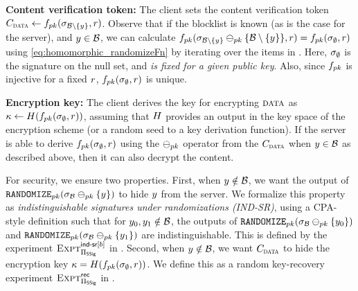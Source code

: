 \itemListStart
\item \textbf{Content verification token:} The client sets the content verification token $\contentToken{\clientData} \assign  \randomizeFn[\pubKey](\genericSig[\genericSetDiff[\blocklist][\genericCInputElmt]], \genericRand)$. Observe that if the blocklist \blocklist is known (as is the case for the server), and  $\genericCInputElmt \in \blocklist$, 
we can calculate
$\randomizeFn[\pubKey](\genericSig[\genericSetDiff[\blocklist][\genericCInputElmt]] 
\sigMinus[\pubKey] \{\genericSetDiff[\blocklist][\genericCInputElmt]\}, \genericRand) = 
\randomizeFn[\pubKey](\genericSig[\emptyset], \genericRand)$ using 
\eqref{eq:homomorphic_randomizeFn} by iterating over the items in \blocklist. Here, $\genericSig[\emptyset]$ 
is the signature on the null set, and \emph{is fixed for a given public key}. Also, since $\randomizeFn[\pubKey]$ is injective for a fixed $\genericRand$, $\randomizeFn[\pubKey](\genericSig[\emptyset], \genericRand)$ is unique. 

\item \textbf{Encryption key:} The client derives the key for encrypting $\clientData$ as
$\genericSymmKey \assign \ro(\randomizeFn[\pubKey](\genericSig[\emptyset], \genericRand))$, assuming that $H$ provides an output in the key space of the encryption scheme (or a random seed to a key derivation function). If the server is able to derive $\randomizeFn[\pubKey](\genericSig[\emptyset], \genericRand)$ using the $\sigMinus[\pubKey]$ operator from the $\contentToken{\clientData}$ when $\genericCInputElmt \in \blocklist$ as described above, then it can also decrypt the content.

\itemListEnd


For security, we ensure two properties. First, when 
$\genericCInputElmt \notin \blocklist$, we want the output of $\randomize[\pubKey](\genericSig[\blocklist] \sigMinus[\pubKey] 
\setDefn{\genericCInputElmt})$ to hide 
$\genericCInputElmt$ from the server. We formalize this property as \emph{indistinguishable signatures under randomizations (IND-SR)}, using a CPA-style definition such that for $\genericCInputElmt{0}, \genericCInputElmt{1} \notin \blocklist$,
the outputs of $\randomize[\pubKey](\genericSig[\blocklist]
\sigMinus[\pubKey] \{\genericCInputElmt{0}\})$ and
$\randomize[\pubKey](\genericSig[\blocklist] \sigMinus[\pubKey]
\{\genericCInputElmt{1}\})$ are indistinguishable. This is defined by the experiment $\Experiment{\indsrLabel[\indBit]}{\sigScheme}$ in . Second, when $\genericCInputElmt \notin \blocklist$, we want $\contentToken{\clientData}$ to hide the encryption key $\genericSymmKey = \ro(\randomizeFn[\pubKey](\genericSig[\emptyset], \genericRand))$. We define this as a random key-recovery experiment $\textsc{Expt}^{\scriptsize\textsf{rec}}_{\Pi_{\mathsf{SSig}}}$ in .


